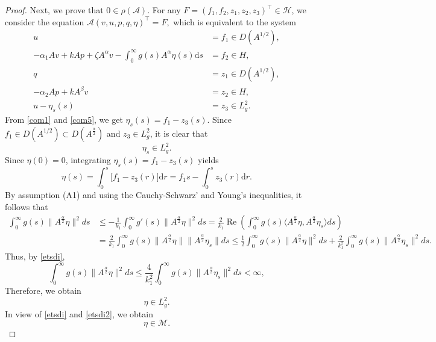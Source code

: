 \documentclass[12pt,reqno]{article}
\begin{document}
\begin{proof}
		Next, we prove that $0 \in \rho(\mathcal{A})$.
		For any $F = (f_1, f_2, z_1, z_2, z_3)^\top \in \mathcal{H}$, we consider the equation
		\(
		\mathcal{A}(v,u,p,q,\eta)^\top = F,
		\)
		which is equivalent to the system
		\begin{align}
			u &= f_1\in D(A^{1/2}), \label{com1}\\
			-\alpha_1 A v + k A p + \zeta A^\alpha v - \int_0^\infty g(s) A^\alpha \eta(s) \mathrm{d}s &= f_2\in H, \label{com2}\\
			q &= z_1\in D(A^{1/2}), \label{com3}\\
			-\alpha_2 A p + k A^\beta v &= z_2\in H, \label{com4}\\
			u - \eta_s(s) &= z_3\in L^2_g.\label{com5}
		\end{align}
		From \eqref{com1}  and \eqref{com5}, we get $\eta_s(s)=f_1-z_3(s)$. Since $f_1\in D(A^{1/2})\subset D(A^{\frac\alpha2})$ and $z_3\in L^2_g$,  it is clear that
		\begin{equation}\label{etsdi}
			\eta_s\in L_g^2.
		\end{equation}
		Since $\eta(0)=0$, integrating $\eta_s(s)=f_1-z_3(s)$ yields
		\[
		\eta(s)=\int_0^s \big[f_1-z_3(r)\big]\mathrm{d}r = f_1 s - \int_0^s z_3(r)\mathrm{d}r.
		\]
		By assumption (A1) and using the Cauchy-Schwarz' and Young's inequalities, it follows that
		\begin{align*}
			\int_{0}^{\infty} g(s)\|A^{\frac{\alpha}{2}}\eta\|^2 ds
			&\leq -\frac{1}{k_{1}} \int_{0}^{\infty} g'(s)\|A^{\frac{\alpha}{2}}\eta\|^2 ds =\frac{2}{k_{1}} \operatorname{Re}\left(\int_{0}^{\infty} g(s)\langle A^{\frac{\alpha}{2}}\eta, A^{\frac{\alpha}{2}}\eta_{s}\rangle ds\right) \\
			&= \frac{2}{k_{1}} \int_{0}^{\infty} g(s)\|A^{\frac{\alpha}{2}}\eta\|
			\|A^{\frac{\alpha}{2}}\eta_{s}\| ds \leq \frac{1}{2} \int_{0}^{\infty} g(s)\|A^{\frac{\alpha}{2}}\eta\|^2 ds
			+\frac{2}{k_{1}^2} \int_{0}^{\infty} g(s)\|A^{\frac{\alpha}{2}}\eta_{s}\|^2 ds.
		\end{align*}
		Thus, by \eqref{etsdi},
		\[
		\int_{0}^{\infty} g(s)\|A^{\frac{\alpha}{2}} \eta\|^{2} d s
		\leq \frac{4}{k_{1}^{2}} \int_{0}^{\infty} g(s)\|A^{\frac{\alpha}{2}} \eta_{s}\|^{2} d s< \infty,
		\]
		Therefore, we obtain
		\begin{equation}\label{etsdi2}
			\eta\in L_g^2.
		\end{equation}
		In view of \eqref{etsdi} and \eqref{etsdi2}, we obtain
		\begin{equation}\label{etsdi3}
			\eta\in \mathcal{M}.
		\end{equation}
		

\end{proof}
\end{document}
